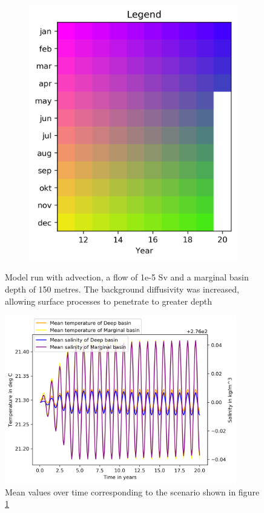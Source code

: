 \documentclass[twocolumn]{article}
\begin{document}
\begin{figure}
\begin{subfigure}[h]{0.20\textwidth}
\includegraphics[width=1.0\textwidth,keepaspectratio]{high_bg_diff_kleine_uitslag_Legend.png}
\end{subfigure}\hfill
\caption{Model run with advection, a flow of 1e-5 Sv and a marginal basin depth of 150 metres. The background diffusivity was increased, allowing surface processes to penetrate to greater depth}
\label{fig:high_db_success}
\end{figure}

\begin{figure}
\centering
\includegraphics[width=0.9\textwidth,keepaspectratio]{high_bg_diff_kleine_uitslag_mean_values.png}
\caption{Mean values over time corresponding to the scenario shown in figure \ref{fig:high_db_success}}
\label{fig:high_bg_diff_means}
\end{figure}\hfill
\end{document}
